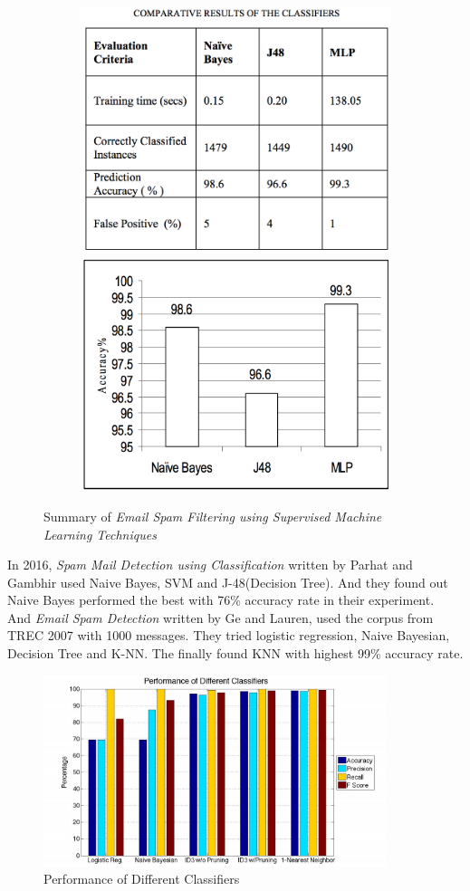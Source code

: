 \begin{figure}[H]
	\begin{subfigure}{\textwidth}
		\centering
		\includegraphics[width=.4\linewidth]{./plots/2010-1.png}
		\includegraphics[width=.4\linewidth]{./plots/2010-2.png}
	\end{subfigure}%
	\caption{Summary of \textit{Email Spam Filtering using Supervised Machine Learning Techniques\cite{EmailMLT}}}
	\label{paper_summary_2010}
\end{figure}



In 2016, \textit{Spam Mail Detection using Classification} written by Parhat and Gambhir used Naive Bayes, SVM and J-48(Decision Tree)\cite{MailDectionCL}. And they found out Naive Bayes performed the best with 76\% accuracy rate in their experiment. \\ 
And \textit{Email Spam Detection} written by Ge and  Lauren\cite{EmailDection}, used the corpus from TREC 2007 with 1000 messages. They tried logistic regression, Naive Bayesian, Decision Tree and K-NN. The finally found KNN with highest 99\% accuracy rate. \\

\begin{figure}[H]
	\centering
	\includegraphics[width=10cm]{./plots/2016.png}
	\caption{Performance of Different Classifiers\cite{EmailDection}}
	\label{paper_summary_2016}
\end{figure}


